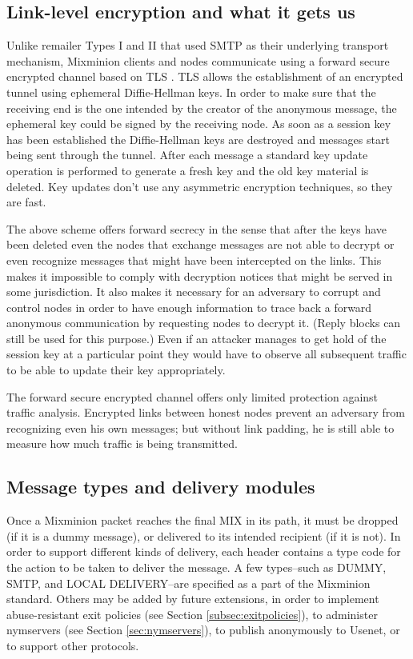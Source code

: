 \documentclass{llncs}
\begin{document}

\subsection{Link-level encryption and what it gets us}

Unlike remailer Types I and II that used SMTP as their underlying 
transport mechanism, Mixminion clients and nodes communicate using a
forward secure encrypted channel based on TLS \cite{TLS}.  TLS allows
the establishment of an encrypted tunnel using ephemeral
Diffie-Hellman keys. In order to make sure that the receiving end is
the one intended by the creator of the anonymous message, the
ephemeral key could be signed by the receiving node. As soon as a
session key has been established the Diffie-Hellman keys are destroyed
and messages start being sent through the tunnel. After each message a
standard key update operation is performed to generate a fresh key and
the old key material is deleted. Key updates don't use any asymmetric
encryption techniques, so they are fast.

The above scheme offers forward secrecy in the sense that after the keys
have been deleted even the
nodes that exchange messages are not able to decrypt or even recognize
messages that might have been intercepted on the links. This makes it
impossible to comply with decryption notices that might be served in
some jurisdiction.  It also makes it necessary for an adversary to
corrupt and control nodes in order to have enough information to trace
back a forward anonymous communication by requesting nodes to decrypt
it. (Reply blocks can still be used for this purpose.)  Even if an
attacker manages to get hold of the session key at a particular point
they would have to observe all subsequent traffic to be able to update
their key appropriately.

The forward secure encrypted channel offers only limited protection
against traffic analysis. Encrypted links between honest nodes prevent
an adversary from recognizing even his own messages; but without
link padding, he is still able to measure how much traffic is being
transmitted.

\subsection{Message types and delivery modules}
\label{subsec:delivery-modules}

Once a Mixminion packet reaches the final MIX in its path, it must be
dropped (if it is a dummy message), or delivered to its intended
recipient (if it is not).  In order to support different kinds of
delivery, each header contains a type code for the action to be taken
to deliver the message.  A few types--such as DUMMY, SMTP, and LOCAL
DELIVERY--are specified as a part of the Mixminion standard.  Others
may be added by future extensions, in order to implement
abuse-resistant exit policies (see Section \ref{subsec:exitpolicies}),
to administer nymservers (see Section \ref{sec:nymservers}), to publish
anonymously to Usenet, or to support other protocols.
\end{document}
